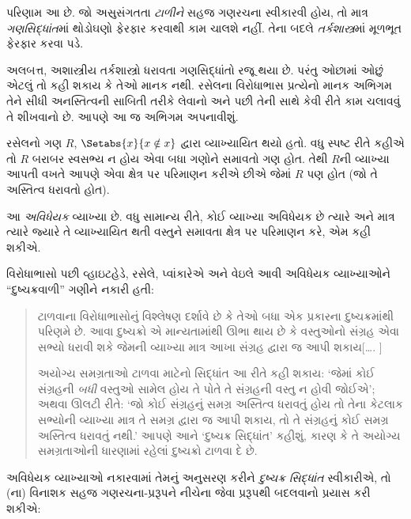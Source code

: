 પરિણામ આ છે. જો અસુસંગતતા \emph{ટાળીને} સહજ ગણરચના સ્વીકારવી
હોય, તો માત્ર \emph{ગણસિદ્ધાંત}માં થોડોઘણો ફેરફાર કરવાથી કામ
ચાલશે નહીં. તેના બદલે \emph{તર્કશાસ્ત્ર}માં મૂળભૂત ફેરફાર કરવા પડે.

અલબત્ત, અશાસ્ત્રીય તર્કશાસ્ત્રો ધરાવતા ગણસિદ્ધાંતો રજૂ થયા છે.
પરંતુ ઓછામાં ઓછું એટલું તો કહી શકાય કે તેઓ માનક નથી. રસેલના
વિરોધાભાસ પ્રત્યેનો માનક અભિગમ તેને સીધી અનસ્તિત્વની સાબિતી તરીકે
લેવાનો અને પછી તેની સાથે કેવી રીતે કામ ચલાવવું તે શીખવાનો છે.
આપણે આ જ અભિગમ અપનાવીશું.
\endgroup

\begingroup
\makeatletter{}\makeatother


\label{guunit:OLP-0533}


રસેલનો ગણ $R$, $\Setabs{x}{x \notin
x}$ દ્વારા વ્યાખ્યાયિત થયો હતો. વધુ સ્પષ્ટ રીતે કહીએ તો $R$
બરાબર સ્વસભ્ય ન હોય એવા બધા ગણોને સમાવતો ગણ હોત. તેથી $R$ની
વ્યાખ્યા આપતી વખતે આપણે એવા ક્ષેત્ર પર પરિમાણન કરીએ છીએ જેમાં
$R$ પણ હોત (જો તે અસ્તિત્વ ધરાવતો હોત).

આ \emph{અવિધેયક} વ્યાખ્યા છે. વધુ સામાન્ય રીતે, કોઈ વ્યાખ્યા
અવિધેયક છે ત્યારે અને માત્ર ત્યારે જ્યારે તે વ્યાખ્યાયિત થતી
વસ્તુને સમાવતા ક્ષેત્ર પર પરિમાણન કરે, એમ કહી શકીએ.

વિરોધાભાસો પછી વ્હાઇટહેડે, રસેલે, પ્વાંકારેએ અને વેઇલે આવી
અવિધેયક વ્યાખ્યાઓને ``દુષ્ચક્રવાળી'' ગણીને નકારી હતી:
\begin{quote}
ટાળવાના વિરોધાભાસોનું વિશ્લેષણ દર્શાવે છે કે તેઓ બધા એક પ્રકારના
દુષ્ચક્રમાંથી પરિણમે છે. આવા દુષ્ચક્રો એ માન્યતામાંથી ઊભા થાય છે
કે વસ્તુઓનો સંગ્રહ એવા સભ્યો ધરાવી શકે જેમની વ્યાખ્યા માત્ર આખા
સંગ્રહ દ્વારા જ આપી શકાય[\ldots. \textparagraph]

અયોગ્ય સમગ્રતાઓ ટાળવા માટેનો સિદ્ધાંત આ રીતે કહી શકાય:
`જેમાં કોઈ સંગ્રહની \emph{બધી} વસ્તુઓ સામેલ હોય તે પોતે તે
સંગ્રહની વસ્તુ ન હોવી જોઈએ'; અથવા ઊલટી રીતે:
`જો કોઈ સંગ્રહનું સમગ્ર અસ્તિત્વ ધરાવતું હોય તો તેના કેટલાક
સભ્યોની વ્યાખ્યા માત્ર તે સમગ્ર દ્વારા જ આપી શકાય, તો તે
સંગ્રહનું કોઈ સમગ્ર અસ્તિત્વ ધરાવતું નથી.' આપણે આને
`દુષ્ચક્ર સિદ્ધાંત' કહીશું, કારણ કે તે અયોગ્ય સમગ્રતાઓની
ધારણામાં રહેલાં દુષ્ચક્રો ટાળવા દે છે.
\citep[p.~37]{WhiteheadRussell1910}
\end{quote}
અવિધેયક વ્યાખ્યાઓ નકારવામાં તેમનું અનુસરણ કરીને
\emph{દુષ્ચક્ર સિદ્ધાંત} સ્વીકારીએ, તો
(ના) વિનાશક સહજ ગણરચના-પ્રરૂપને
નીચેના જેવા પ્રરૂપથી બદલવાનો પ્રયાસ કરી શકીએ:


